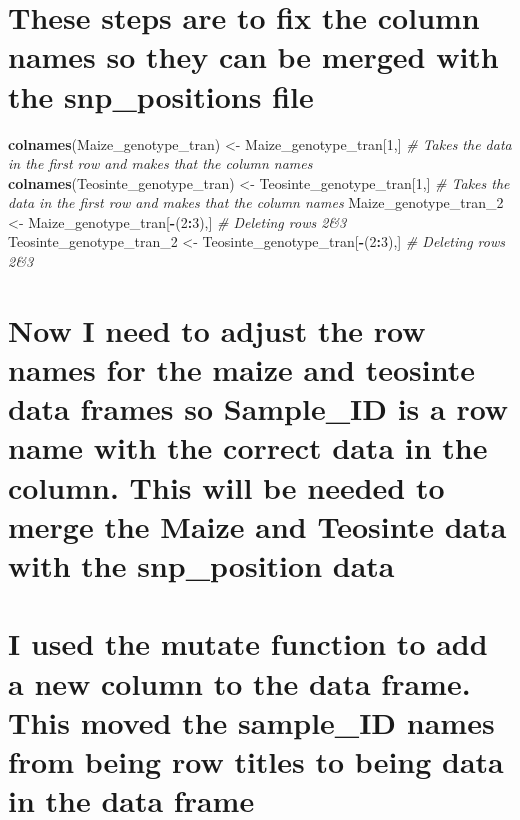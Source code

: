 \documentclass[
]{article}
\newenvironment{Shaded}{\begin{snugshade}}{\end{snugshade}}
\newcommand{\CommentTok}[1]{\textcolor[rgb]{0.56,0.35,0.01}{\textit{#1}}}
\newcommand{\DecValTok}[1]{\textcolor[rgb]{0.00,0.00,0.81}{#1}}
\newcommand{\FunctionTok}[1]{\textcolor[rgb]{0.13,0.29,0.53}{\textbf{#1}}}
\newcommand{\NormalTok}[1]{#1}
\newcommand{\OtherTok}[1]{\textcolor[rgb]{0.56,0.35,0.01}{#1}}
\newcommand{\SpecialCharTok}[1]{\textcolor[rgb]{0.81,0.36,0.00}{\textbf{#1}}}
\begin{document}
\section{These steps are to fix the column names so they can be merged
with the snp\_positions
file}\label{these-steps-are-to-fix-the-column-names-so-they-can-be-merged-with-the-snp_positions-file}

\begin{Shaded}
\begin{Highlighting}[]
\FunctionTok{colnames}\NormalTok{(Maize\_genotype\_tran) }\OtherTok{\textless{}{-}}\NormalTok{ Maize\_genotype\_tran[}\DecValTok{1}\NormalTok{,] }\CommentTok{\# Takes the data in the first row and makes that the column names}
\FunctionTok{colnames}\NormalTok{(Teosinte\_genotype\_tran) }\OtherTok{\textless{}{-}}\NormalTok{ Teosinte\_genotype\_tran[}\DecValTok{1}\NormalTok{,] }\CommentTok{\# Takes the data in the first row and makes that the column names}
\NormalTok{Maize\_genotype\_tran\_2 }\OtherTok{\textless{}{-}}\NormalTok{ Maize\_genotype\_tran[}\SpecialCharTok{{-}}\NormalTok{(}\DecValTok{2}\SpecialCharTok{:}\DecValTok{3}\NormalTok{),] }\CommentTok{\# Deleting rows 2\&3}
\NormalTok{Teosinte\_genotype\_tran\_2 }\OtherTok{\textless{}{-}}\NormalTok{ Teosinte\_genotype\_tran[}\SpecialCharTok{{-}}\NormalTok{(}\DecValTok{2}\SpecialCharTok{:}\DecValTok{3}\NormalTok{),] }\CommentTok{\# Deleting rows 2\&3}
\end{Highlighting}
\end{Shaded}

\section{Now I need to adjust the row names for the maize and teosinte
data frames so Sample\_ID is a row name with the correct data in the
column. This will be needed to merge the Maize and Teosinte data with
the snp\_position
data}\label{now-i-need-to-adjust-the-row-names-for-the-maize-and-teosinte-data-frames-so-sample_id-is-a-row-name-with-the-correct-data-in-the-column.-this-will-be-needed-to-merge-the-maize-and-teosinte-data-with-the-snp_position-data}

\section{I used the mutate function to add a new column to the data
frame. This moved the sample\_ID names from being row titles to being
data in the data
frame}\label{i-used-the-mutate-function-to-add-a-new-column-to-the-data-frame.-this-moved-the-sample_id-names-from-being-row-titles-to-being-data-in-the-data-frame}
\end{document}
